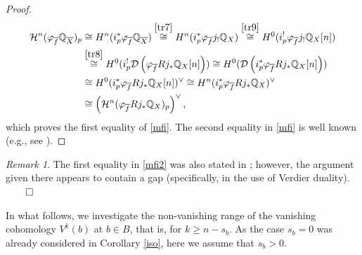 \documentclass[12pt,leqno,twoside]{amsart}
\newtheorem{corollary}[theorem]{Corollary}
\theoremstyle{remark}
\newtheorem{remark}[theorem]{\sc Remark}
\theoremstyle{remark}
\theoremstyle{definition}
\theoremstyle{remark}
\theoremstyle{remark}
\theoremstyle{remark}
\numberwithin{equation}{section}  %
\def\be{\begin{equation}}
\def\ee{\end{equation}}
\newcommand{\Q}{\mathbb{Q}}
\newcommand{\cD}{\mathcal{D}}
\newcommand{\cH}{\mathcal{H}}
\newcommand{\bQ}{\mathbb{Q}}
\newcommand{\bZ}{\mathbb{Z}}
\newcommand{\of}{\overline{f}}
\newcommand{\oX}{\overline{X}}
\begin{document}
\begin{proof}
\begin{equation}
\begin{split}
\cH^n(\varphi_{\of}\bQ_{\oX})_p & \cong H^n(i_p^*\varphi_{\of}\bQ_{\oX}) \overset{\eqref{tr7}}{\cong} H^n(i_p^*\varphi_{\of} j_!\Q_X) 
\overset{\eqref{tr9}}{\cong} H^0(i_p^!\varphi_{\of} j_!\Q_X[n]) \\
&\overset{\eqref{tr8}}{\cong} H^0(i_p^! \cD\left(\varphi_{\of} Rj_*\Q_{X}[n] \right)) 
\cong H^0( \cD\left( i_p^* \varphi_{\of} Rj_*\Q_{X}[n] \right)) \\
& \cong H^0(  i_p^* \varphi_{\of} Rj_*\Q_{X}[n] )^\vee
\cong H^n(  i_p^* \varphi_{\of} Rj_*\Q_{X})^\vee \\
& \cong \left(\cH^n(\varphi_{\of}Rj_*\bQ_X)_p\right)^\vee ,
\end{split}
\end{equation}
which proves the first equality of \eqref{mfi}. The second equality in \eqref{mfi} is well known (e.g., see \cite[Ex.10.4.15]{MS}).
\end{proof}



\begin{remark}
The first equality in \eqref{mfi2} was also stated in \cite[Ex.6.2.20]{Di}; however, the argument given there appears to contain a gap (specifically, in the use of Verdier duality). $\hfill\qed$
\end{remark}


In what follows, we  investigate the non-vanishing range of the vanishing cohomology $V^k(b)$ at $b\in B$, that is, for $k \geq n-s_b$.
As the case $s_b=0$ was already considered in Corollary \ref{iso}, here we assume that $s_b>0$.
\end{document}
